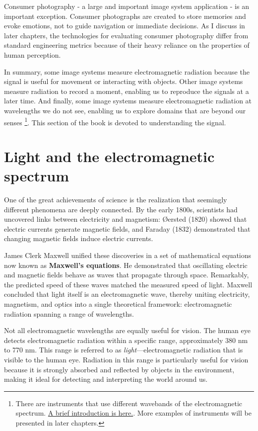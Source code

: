 \documentclass[
  letterpaper,
]{book}
\begin{document}
Consumer photography - a large and important image system application -
is an important exception. Consumer photographs are created to store
memories and evoke emotions, not to guide navigation or immediate
decisions. As I discuss in later chapters, the technologies for
evaluating consumer photography differ from standard engineering metrics
because of their heavy reliance on the properties of human perception.

In summary, some image systems measure electromagnetic radiation because
the signal is useful for movement or interacting with objects. Other
image systems measure radiation to record a moment, enabling us to
reproduce the signals at a later time. And finally, some image systems
measure electromagnetic radiation at wavelengths we do not see, enabling
us to explore domains that are beyond our senses \footnote{There are
  instruments that use different wavebands of the electromagnetic
  spectrum. \href{resources/lightfields-wavebands.html}{A brief
  introduction is here.}. More examples of instruments will be presented
  in later chapters.}. This section of the book is devoted to
understanding the signal.

\section{Light and the electromagnetic
spectrum}\label{sec-light-em-spectrum}

One of the great achievements of science is the realization that
seemingly different phenomena are deeply connected. By the early 1800s,
scientists had uncovered links between electricity and magnetism:
Øersted (1820) showed that electric currents generate magnetic fields,
and Faraday (1832) demonstrated that changing magnetic fields induce
electric currents.

James Clerk Maxwell unified these discoveries in a set of mathematical
equations now known as \textbf{Maxwell's equations}. He demonstrated
that oscillating electric and magnetic fields behave as waves that
propagate through space. Remarkably, the predicted speed of these waves
matched the measured speed of light. Maxwell concluded that light itself
is an electromagnetic wave, thereby uniting electricity, magnetism, and
optics into a single theoretical framework: electromagnetic radiation
spanning a range of wavelengths.

Not all electromagnetic wavelengths are equally useful for vision. The
human eye detects electromagnetic radiation within a specific range,
approximately 380 nm to 770 nm. This range is referred to as
\emph{light}---electromagnetic radiation that is visible to the human
eye. Radiation in this range is particularly useful for vision because
it is strongly absorbed and reflected by objects in the environment,
making it ideal for detecting and interpreting the world around us.
\end{document}

